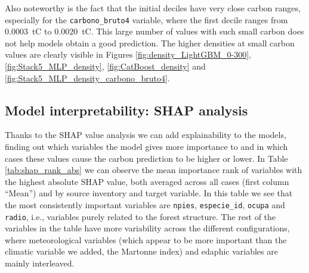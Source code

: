 Also noteworthy is the fact that the initial deciles have very close carbon ranges, especially for the \texttt{carbono\_bruto4} variable, where the first decile ranges from $0.0003$~tC to $0.0020$~tC. This large number of values with such small carbon does not help models obtain a good prediction. The higher densities at small carbon values are clearly visible in Figures \ref{fig:density_LightGBM_0-300}, \ref{fig:Stack5_MLP_density}, \ref{fig:CatBoost_density} and \ref{fig:Stack5_MLP_density_carbono_bruto4}.

\subsection{Model interpretability: SHAP analysis}
\label{sec:interpretabilidad_shap}

Thanks to the SHAP value analysis we can add explainability to the models, finding out which variables the model gives more importance to and in which cases these values cause the carbon prediction to be higher or lower. In Table \ref{tab:shap_rank_abs} we can observe the mean importance rank of variables with the highest absolute SHAP value, both averaged across all cases (first column ``Mean'') and by source inventory and target variable. In this table we see that the most consistently important variables are \texttt{npies}, \texttt{especie\_id}, \texttt{ocupa} and \texttt{radio}, i.e., variables purely related to the forest structure. The rest of the variables in the table have more variability across the different configurations, where meteorological variables (which appear to be more important than the climatic variable we added, the Martonne index) and edaphic variables are mainly interleaved.

